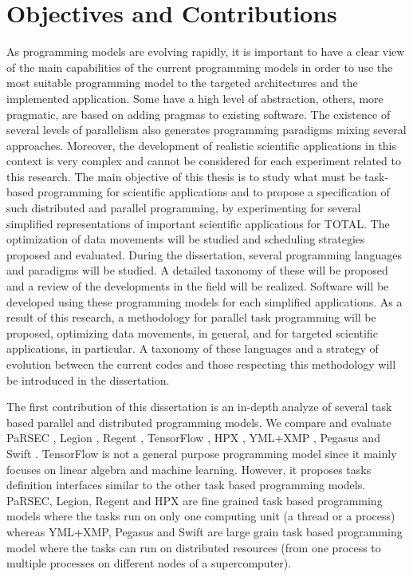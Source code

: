 \section{Objectives and Contributions}

As programming models are evolving rapidly, it is important to have a clear view of the main capabilities of the current programming models in order to use the most suitable programming model to the targeted architectures and the implemented application.
Some have a high level of abstraction, others, more pragmatic, are based on adding pragmas to existing software.
The existence of several levels of parallelism also generates programming paradigms mixing several approaches.
Moreover, the development of realistic scientific applications in this context is very complex and cannot be considered for each experiment related to this research.
The main objective of this thesis is to study what must be task-based programming for scientific applications and to propose a specification of such distributed and parallel programming, by experimenting for several simplified representations of important scientific applications for TOTAL.
The optimization of data movements will be studied and scheduling strategies proposed and evaluated.
During the dissertation, several programming languages and paradigms will be studied.
A detailed taxonomy of these will be proposed and a review of the developments in the field will be realized.
Software will be developed using these programming models for each simplified applications.
As a result of this research, a methodology for parallel task programming will be proposed, optimizing data movements, in general, and for targeted scientific applications, in particular.
A taxonomy of these languages and a strategy of evolution between the current codes and those respecting this methodology will be introduced in the dissertation.

The first contribution of this dissertation is an in-depth analyze of several task based parallel and distributed programming models.
We compare and evaluate PaRSEC \cite{BBDHL2011}, Legion \cite{BaTSA2012}, Regent \cite{SLTBA2015}, TensorFlow \cite{AABBC2016}, HPX \cite{KHASF2014}, YML+XMP \cite{DelaP2004}, Pegasus \cite{DSSBG2005} and Swift \cite{ZHCFL2007}.
TensorFlow is not a general purpose programming model since it mainly focuses on linear algebra and machine learning.
However, it proposes tasks definition interfaces similar to the other task based programming models.
PaRSEC, Legion, Regent and HPX are fine grained task based programming models where the tasks run on only one computing unit (a thread or a process) whereas YML+XMP, Pegasus and Swift are large grain task based programming model where the tasks can run on distributed resources (from one process to multiple processes on different nodes of a supercomputer).

